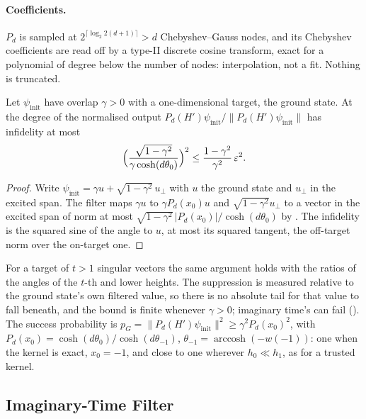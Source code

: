 \paragraph{Coefficients.} $P_d$ is sampled at $2^{\lceil\log_2 2(d+1)\rceil}>d$ Chebyshev--Gauss nodes, and its Chebyshev coefficients are read off by a type-II discrete cosine transform, exact for a polynomial of degree below the number of nodes: interpolation, not a fit. Nothing is truncated.

\begin{proposition}[Guarantee]
\label{prop:minimax-guarantee}
Let $\psi_{\mathrm{init}}$ have overlap $\gamma>0$ with a one-dimensional target, the ground state. At the degree of  the normalised output $P_d(H')\psi_{\mathrm{init}}/\|P_d(H')\psi_{\mathrm{init}}\|$ has infidelity at most
\begin{equation*}
    \Bigl(\frac{\sqrt{1-\gamma^2}}{\gamma\cosh(d\theta_0)}\Bigr)^2\le\frac{1-\gamma^2}{\gamma^2}\,\varepsilon^2 .
\end{equation*}
\end{proposition}
\begin{proof}
Write $\psi_{\mathrm{init}}=\gamma u+\sqrt{1-\gamma^2}\,u_\perp$ with $u$ the ground state and $u_\perp$ in the excited span. The filter maps $\gamma u$ to $\gamma P_d(x_0)u$ and $\sqrt{1-\gamma^2}u_\perp$ to a vector in the excited span of norm at most $\sqrt{1-\gamma^2}\,|P_d(x_0)|/\cosh(d\theta_0)$ by . The infidelity is the squared sine of the angle to $u$, at most its squared tangent, the off-target norm over the on-target one.
\end{proof}

For a target of $t>1$ singular vectors the same argument holds with the ratios of the angles of the $t$-th and lower heights. The suppression is measured relative to the ground state's own filtered value, so there is no absolute tail for that value to fall beneath, and the bound is finite whenever $\gamma>0$; imaginary time's can fail (). The success probability is $p_G=\|P_d(H')\psi_{\mathrm{init}}\|^2\ge\gamma^2P_d(x_0)^2$, with $P_d(x_0)=\cosh(d\theta_0)/\cosh(d\theta_{-1})$, $\theta_{-1}=\operatorname{arccosh}(-w(-1))$: one when the kernel is exact, $x_0=-1$, and close to one wherever $h_0\ll h_1$, as for a trusted kernel.

\subsection{Imaginary-Time Filter}
\label{app:qite-filter}

